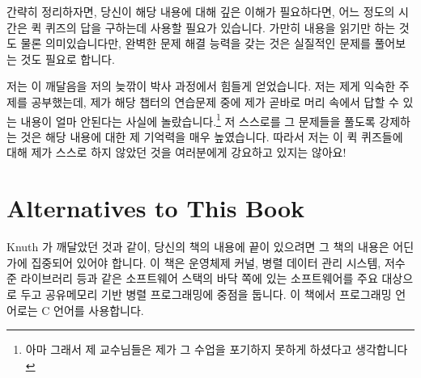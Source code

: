 간략히 정리하자면, 당신이 해당 내용에 대해 깊은 이해가 필요하다면, 어느 정도의
시간은 퀵 퀴즈의 답을 구하는데 사용할 필요가 있습니다.
가만히 내용을 읽기만 하는 것도 물론 의미있습니다만, 완벽한 문제 해결 능력을
갖는 것은 실질적인 문제를 풀어보는 것도 필요로 합니다.

\iffalse
In short, if you need a deep
understanding of the material, then you should invest some time
into answering the Quick Quizzes.
Don't get me wrong, passively reading the material can be quite
valuable, but gaining full problem-solving capability really
does require that you practice solving problems.
\fi

저는 이 깨달음을 저의 늦깎이 박사 과정에서 힘들게 얻었습니다.  저는 제게 익숙한
주제를 공부했는데, 제가 해당 챕터의 연습문제 중에 제가 곧바로 머리 속에서 답할
수 있는 내용이 얼마 안된다는 사실에 놀랐습니다.\footnote{ 아마 그래서 제
교수님들은 제가 그 수업을 포기하지 못하게 하셨다고 생각합니다} 저 스스로를 그
문제들을 풀도록 강제하는 것은 해당 내용에 대한 제 기억력을 매우 높였습니다.
따라서 저는 이 퀵 퀴즈들에 대해 제가 스스로 하지 않았던 것을 여러분에게
강요하고 있지는 않아요!

\iffalse
I learned this the hard way during coursework for my late-in-life
Ph.D.
I was studying a familiar topic, and was surprised at how few of
the chapter's exercises I could answer off the top of my head.\footnote{
	So I suppose that it was just as well that my professors refused
	to let me waive that class!}
Forcing myself to answer the questions greatly increased my
retention of the material.
So with these Quick Quizzes I am not asking you to do anything
that I have not been doing myself!
\fi

\section{Alternatives to This Book}
\label{sec:Alternatives to This Book}

Knuth 가 깨달았던 것과 같이, 당신의 책의 내용에 끝이 있으려면 그 책의 내용은
어딘가에 집중되어 있어야 합니다.  이 책은 운영체제 커널, 병렬 데이터 관리
시스템, 저수준 라이브러리 등과 같은 소프트웨어 스택의 바닥 쪽에 있는
소프트웨어를 주요 대상으로 두고 공유메모리 기반 병렬 프로그래밍에 중점을
둡니다.
이 책에서 프로그래밍 언어로는 C 언어를 사용합니다.

\iffalse
As Knuth learned, if you want your book to be finite, it must be focused.
This book focuses on shared-memory parallel programming, with an
emphasis on software that lives near the bottom of the software stack,
such as operating-system kernels, parallel data-management systems,
low-level libraries, and the like.
The programming language used by this book is C.
\fi

